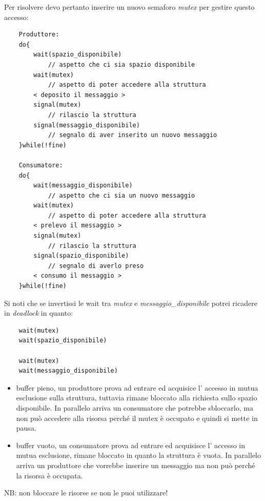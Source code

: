 Per risolvere devo pertanto inserire un nuovo semaforo \emph{mutex} per gestire questo accesso:
\begin{verbatim}
    Produttore:
    do{
        wait(spazio_disponibile)
            // aspetto che ci sia spazio disponibile
        wait(mutex)
            // aspetto di poter accedere alla struttura
        < deposito il messaggio >
        signal(mutex)
            // rilascio la struttura
        signal(messaggio_disponibile)
            // segnalo di aver inserito un nuovo messaggio
    }while(!fine)
    
    Consumatore:
    do{
        wait(messaggio_disponibile)
            // aspetto che ci sia un nuovo messaggio
        wait(mutex)
            // aspetto di poter accedere alla struttura
        < prelevo il messaggio >
        signal(mutex)
            // rilascio la struttura
        signal(spazio_disponibile)
            // segnalo di averlo preso
        < consumo il messaggio > 
    }while(!fine)
\end{verbatim}

Si noti che se invertissi le wait tra \emph{mutex} e \emph{messaggio\_disponibile} potrei ricadere in \emph{deadlock} in quanto:
\begin{verbatim}
    wait(mutex)
    wait(spazio_disponibile)

    wait(mutex)
    wait(messaggio_disponibile)
\end{verbatim}

\begin{itemize}
    \item buffer pieno, un produttore prova ad entrare ed acquisice l' accesso in mutua esclusione sulla struttura, tuttavia rimane bloccato alla richiesta sullo spazio disponibile. In parallelo arriva un consumatore che potrebbe sbloccarlo, ma non può accedere alla risorsa perché il mutex è occupato e quindi si mette in pausa.
    
    \item buffer vuoto, un consumatore prova ad entrare ed acquisisce l' accesso in mutua esclusione, rimane bloccato in quanto la struttura è vuota. In parallelo arriva un produttore che vorrebbe inserire un messaggio ma non può perché la risorsa è occupata.
\end{itemize}
NB: non bloccare le risorse se non le puoi utilizzare!

